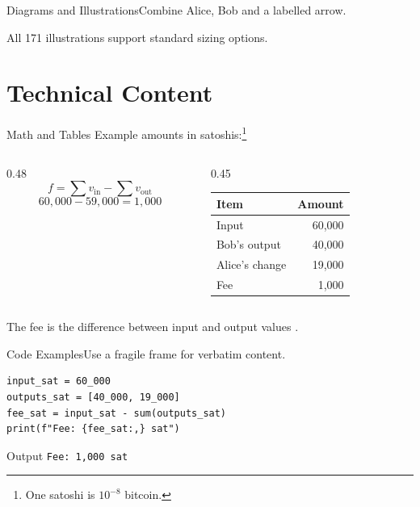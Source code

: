 \documentclass[aspectratio=169]{beamer}
\begin{document}
\begin{frame}{Diagrams and Illustrations}{Combine Alice, Bob and a labelled arrow.}
\centering
{}
\bigskip
\small All 171 illustrations support standard sizing options.
\end{frame}

\section{Technical Content}

\begin{frame}{Math and Tables}
Example amounts in satoshis:\footnote{One satoshi is $10^{-8}$ bitcoin.}
\medskip
\begin{columns}[c,onlytextwidth]
  \begin{column}{0.48\textwidth}
    \[
      f = \sum v_{\mathrm{in}} - \sum v_{\mathrm{out}}
    \]
    \[
      60{,}000 - 59{,}000 = 1{,}000
    \]
  \end{column}
  \begin{column}{0.45\textwidth}
    \small
    \begin{tabular}{@{}lr@{}}
    \toprule
    \textbf{Item} & \textbf{Amount} \\
    \midrule
    Input & 60,000 \\
    Bob's output & 40,000 \\
    Alice's change & 19,000 \\
    Fee & 1,000 \\
    \bottomrule
    \end{tabular}
  \end{column}
\end{columns}
\medskip
\small The fee is the difference between input and output values
\cite{bitcoin-transactions}.
\end{frame}

\begin{frame}[fragile]{Code Examples}{Use a fragile frame for verbatim content.}
\begin{verbatim}
input_sat = 60_000
outputs_sat = [40_000, 19_000]
fee_sat = input_sat - sum(outputs_sat)
print(f"Fee: {fee_sat:,} sat")
\end{verbatim}
\begin{exampleblock}{Output}
\texttt{Fee: 1,000 sat}
\end{exampleblock}
\end{frame}
\end{document}
